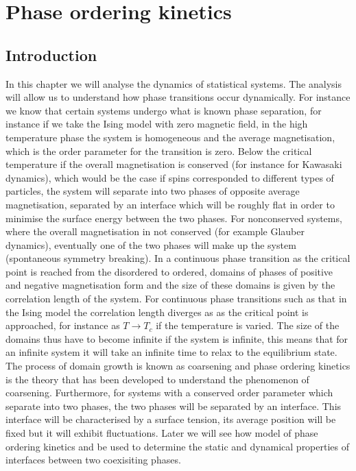 \documentclass[11pt]{report}
\begin{document}
\chapter{Phase ordering kinetics}
\section{Introduction}
In this chapter we will analyse the dynamics of statistical systems. The analysis will allow us to understand how phase transitions occur dynamically. For instance we know that certain systems undergo what is known phase separation, for instance if we take the Ising model with zero magnetic field, in the high temperature phase the system is homogeneous and the average magnetisation, which is the order parameter for the transition is zero. Below the critical temperature if the overall magnetisation is conserved (for instance for Kawasaki dynamics), which would be the case if spins corresponded to different types of particles, the system will separate into two  phases of opposite average magnetisation, separated by an interface which will be roughly flat in order to minimise the surface energy between the two phases. For nonconserved systems, where the overall magnetisation in not conserved (for example Glauber dynamics), eventually one of the two phases will make up the system (spontaneous symmetry breaking). In a continuous phase transition as the critical point is reached from the disordered to ordered, domains of phases of positive and negative magnetisation form and the size of these domains is given by the correlation length of the system. For continuous phase transitions such as that in the Ising model the correlation length diverges as as the critical point is approached, for instance as $T\to T_c$ if the temperature is varied. The size of the domains thus have to become infinite if the system is infinite, this means that for an infinite system it will take an infinite time to relax to the equilibrium state. The process of domain growth is known as coarsening and phase ordering kinetics is the theory that has been developed to understand the phenomenon of coarsening. Furthermore, for systems with a conserved order parameter which separate into two phases, the two phases will be separated by an interface. This interface will be characterised by a surface tension, its average position will be fixed but it will exhibit fluctuations. Later we will see how model of phase ordering kinetics and be used to determine the static and dynamical properties of interfaces between two coexisiting phases. 
\end{document}
